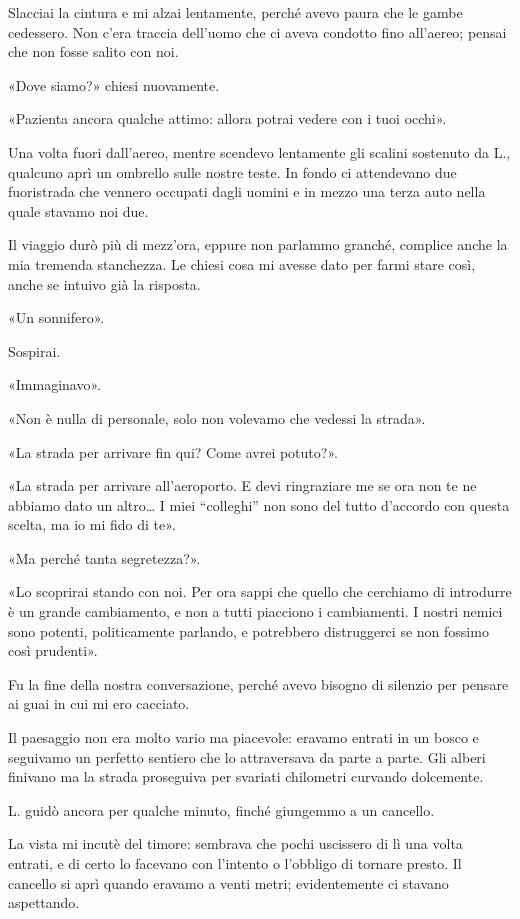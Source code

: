 \documentclass[a4paper,10pt]{memoir}
\begin{document}
Slacciai la cintura e mi alzai lentamente, perché avevo paura che le gambe cedessero. Non c'era traccia dell'uomo che ci
aveva condotto fino all'aereo; pensai che non fosse salito con noi.

«Dove siamo?» chiesi nuovamente.

«Pazienta ancora qualche attimo: allora potrai vedere con i tuoi occhi».

Una volta fuori dall'aereo, mentre scendevo lentamente gli scalini sostenuto da L., qualcuno aprì un ombrello sulle
nostre teste. In fondo ci attendevano due fuoristrada che vennero occupati dagli uomini e in mezzo una terza auto nella
quale stavamo noi due.

Il viaggio durò più di mezz'ora, eppure non parlammo granché, complice anche la mia tremenda stanchezza. Le chiesi cosa
mi avesse dato per farmi stare così, anche se intuivo già la risposta.

«Un sonnifero».

Sospirai.

«Immaginavo».

«Non è nulla di personale, solo non volevamo che vedessi la strada».

«La strada per arrivare fin qui? Come avrei potuto?».

«La strada per arrivare all'aeroporto. E devi ringraziare me se ora non te ne abbiamo dato un altro\dots{} I miei
``colleghi'' non sono del tutto d'accordo con questa scelta, ma io mi fido di te».

«Ma perché tanta segretezza?».

«Lo scoprirai stando con noi. Per ora sappi che quello che cerchiamo di introdurre è un grande cambiamento, e non a
tutti piacciono i cambiamenti. I nostri nemici sono potenti, politicamente parlando, e potrebbero distruggerci se non
fossimo così prudenti».

Fu la fine della nostra conversazione, perché avevo bisogno di silenzio per pensare ai guai in cui mi ero cacciato.

Il paesaggio non era molto vario ma piacevole: eravamo entrati in un bosco e seguivamo un perfetto sentiero che lo
attraversava da parte a parte. Gli alberi finivano ma la strada proseguiva per svariati chilometri curvando dolcemente.

L. guidò ancora per qualche minuto, finché giungemmo a un cancello.

La vista mi incutè del timore: sembrava che pochi uscissero di lì una volta entrati, e di certo lo facevano con
l'intento o l'obbligo di tornare presto. Il cancello si aprì quando eravamo a venti metri; evidentemente ci stavano
aspettando.
\end{document}
